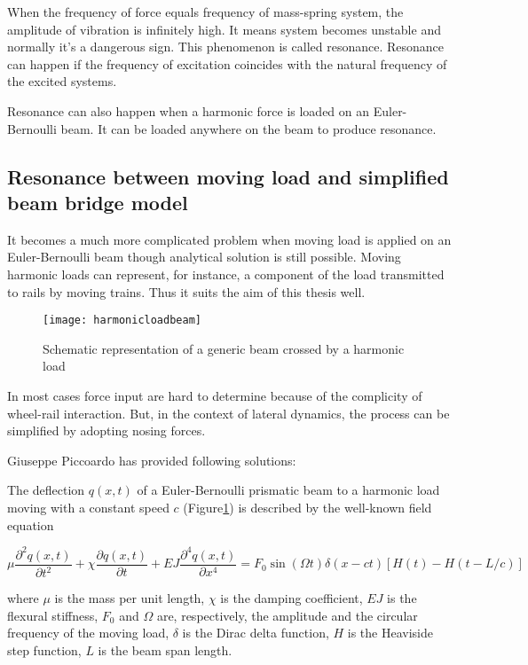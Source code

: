 When the frequency of force equals frequency of mass-spring system, the amplitude of vibration is infinitely high. It means system becomes unstable and normally it's a dangerous sign. This phenomenon is called resonance. Resonance can happen if the frequency of excitation coincides with the natural frequency of the excited systems.

Resonance can also happen when a harmonic force is loaded on an Euler-Bernoulli beam. It can be loaded anywhere on the beam to produce resonance. 

\subsection{Resonance between moving load and simplified beam bridge model}\label{sec:harmonicloadmodel}
It becomes a much more complicated problem when moving load is applied on an Euler-Bernoulli beam though analytical solution is still possible. Moving harmonic loads can represent, for instance, a component of the load transmitted to rails by moving trains. Thus it suits the aim of this thesis well.

\begin{figure}[h]
	\centering
	\texttt{[image: harmonicloadbeam]}
	\caption{Schematic representation of a generic beam crossed by a harmonic load}
	\label{fig:harmonicloadbeam}
\end{figure}

In most cases force input are hard to determine because of the complicity of wheel-rail interaction. But, in the context of lateral dynamics, the process can be simplified by adopting nosing forces. 

Giuseppe Piccoardo \cite{giuseppe2012dynamic} has provided following solutions:

The deflection $q(x,t)$ of a Euler-Bernoulli prismatic beam to a harmonic load moving with a constant speed $c$ (Figure\ref{fig:harmonicloadbeam}) is described by the well-known field equation

$$\mu \frac{\partial^2 q(x,t)}{\partial t^2} + \chi \frac{\partial q(x,t)}{\partial t}+EJ\frac{\partial^4 q(x,t)}{\partial x^4} = F_0 \sin(\Omega t)\delta(x-ct)[H(t)-H(t-L/c)]$$

where $\mu$ is the mass per unit length, $\chi$ is the damping coefficient, $EJ$ is the flexural stiffness, $F_0$ and $\Omega$ are, respectively, the amplitude and the circular frequency of the moving load, $\delta$ is the Dirac delta function, $H$ is the Heaviside step function, $L$ is the beam span length.

